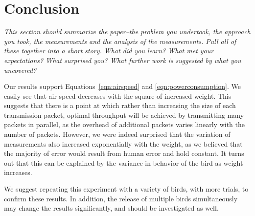 \section{Conclusion}
\label{sec:conclusion}

\emph{This section should summarize the paper--the problem you undertook, the approach you took, the measurements and the analysis of the measurements.  Pull all of these together into a short story. What did you learn? What met your expectations? What surprised you? What further work is suggested by what you uncovered?}

Our results support Equations~\ref{eqn:airspeed} and \ref{eqn:powerconsumption}. We easily see that air speed decreases with the square of increased weight. This suggests that there is a point at which rather than increasing the size of each transmission packet, optimal throughput will be achieved by transmitting many packets in parallel, as the overhead of additional packets varies linearly with the number of packets. However, we were indeed surprised that the variation of measurements also increased exponentially with the weight, as we believed that the majority of error would result from human error and hold constant. It turns out that this can be explained by the variance in behavior of the bird as weight increases.

We suggest repeating this experiment with a variety of birds, with more trials, to confirm these results. In addition, the release of multiple birds simultaneously may change the results significantly, and should be investigated as well.
